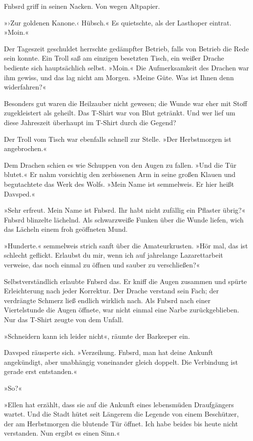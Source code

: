 Fnbsrd griff in seinen Nacken. Von wegen Altpapier.

»›Zur goldenen Kanone.‹ Hübsch.« Es quietschte, als der Lasthoper eintrat. »Moin.«

Der Tageszeit geschuldet herrschte gedämpfter Betrieb, falls von Betrieb die Rede sein konnte. Ein Troll saß am einzigen besetzten Tisch, ein weißer Drache bediente sich hauptsächlich selbst. »Moin.« Die Aufmerksamkeit des Drachen war ihm gewiss, und das lag nicht am Morgen. »Meine Güte. Was ist Ihnen denn widerfahren?«

Besonders gut waren die Heilzauber nicht gewesen; die Wunde war eher mit Stoff zugekleistert als geheilt. Das T-Shirt war von Blut getränkt. Und wer lief um diese Jahreszeit überhaupt im T-Shirt durch die Gegend?

Der Troll vom Tisch war ebenfalls schnell zur Stelle. »Der Herbstmorgen ist angebrochen.«

Dem Drachen schien es wie Schuppen von den Augen zu fallen. »Und die Tür blutet.« Er nahm vorsichtig den zerbissenen Arm in seine großen Klauen und begutachtete das Werk des Wolfs. »Mein Name ist semmelweis. Er hier heißt Davsped.«

»Sehr erfreut. Mein Name ist Fnbsrd. Ihr habt nicht zufällig ein Pflaster übrig?« Fnbsrd blinzelte lächelnd. Als schwarzweiße Funken über die Wunde liefen, wich das Lächeln einem froh geöffneten Mund.

»Hunderte.« semmelweis strich sanft über die Amateurkrusten. »Hör mal, das ist schlecht geflickt. Erlaubst du mir, wenn ich auf jahrelange Lazarettarbeit verweise, das noch einmal zu öffnen und sauber zu verschließen?«

Selbstverständlich erlaubte Fnbsrd das. Er kniff die Augen zusammen und spürte Erleichterung nach jeder Korrektur. Der Drache verstand sein Fach; der verdrängte Schmerz ließ endlich wirklich nach. Als Fnbsrd nach einer Viertelstunde die Augen öffnete, war nicht einmal eine Narbe zurückgeblieben. Nur das T-Shirt zeugte von dem Unfall.

»Schneidern kann ich leider nicht«, räumte der Barkeeper ein.

Davsped räusperte sich. »Verzeihung. Fnbsrd, man hat deine Ankunft angekündigt, aber unabhängig voneinander gleich doppelt. Die Verbindung ist gerade erst entstanden.«

»So?«

»Ellen hat erzählt, dass sie auf die Ankunft eines lebensmüden Draufgängers wartet. Und die Stadt hütet seit Längerem die Legende von einem Beschützer, der am Herbstmorgen die blutende Tür öffnet. Ich habe beides bis heute nicht verstanden. Nun ergibt es einen Sinn.«

